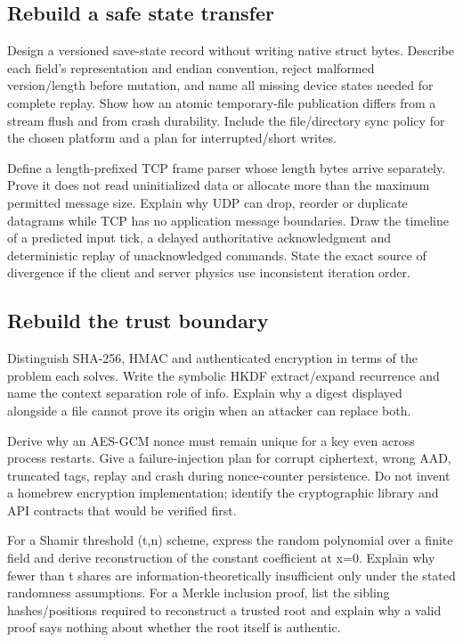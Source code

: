 \subsection{Rebuild a safe state transfer}\label{appendix-11f73b337e37-rebuild-a-safe-state-transfer}

Design a versioned save-state record without writing native struct bytes. Describe each field's representation and endian convention, reject malformed version/length before mutation, and name all missing device states needed for complete replay. Show how an atomic temporary-file publication differs from a stream flush and from crash durability. Include the file/directory sync policy for the chosen platform and a plan for interrupted/short writes.

Define a length-prefixed TCP frame parser whose length bytes arrive separately. Prove it does not read uninitialized data or allocate more than the maximum permitted message size. Explain why UDP can drop, reorder or duplicate datagrams while TCP has no application message boundaries. Draw the timeline of a predicted input tick, a delayed authoritative acknowledgment and deterministic replay of unacknowledged commands. State the exact source of divergence if the client and server physics use inconsistent iteration order.

\subsection{Rebuild the trust boundary}\label{appendix-11f73b337e37-rebuild-the-trust-boundary}

Distinguish SHA-256, HMAC and authenticated encryption in terms of the problem each solves. Write the symbolic HKDF extract/expand recurrence and name the context separation role of info. Explain why a digest displayed alongside a file cannot prove its origin when an attacker can replace both.

Derive why an AES-GCM nonce must remain unique for a key even across process restarts. Give a failure-injection plan for corrupt ciphertext, wrong AAD, truncated tags, replay and crash during nonce-counter persistence. Do not invent a homebrew encryption implementation; identify the cryptographic library and API contracts that would be verified first.

For a Shamir threshold (t,n) scheme, express the random polynomial over a finite field and derive reconstruction of the constant coefficient at x=0. Explain why fewer than t shares are information-theoretically insufficient only under the stated randomness assumptions. For a Merkle inclusion proof, list the sibling hashes/positions required to reconstruct a trusted root and explain why a valid proof says nothing about whether the root itself is authentic.

